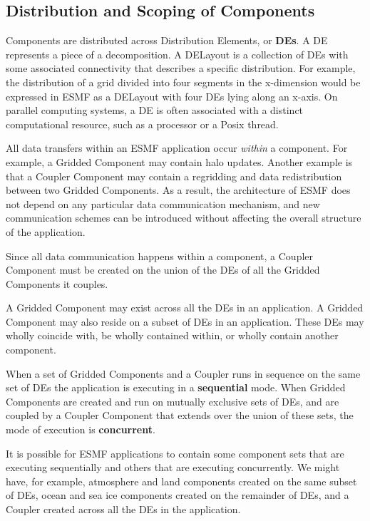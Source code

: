 \subsection{Distribution and Scoping of Components}
\label{sec:scoping}

Components are distributed across Distribution Elements, or {\bf DEs}.
A DE represents a piece of a decomposition.  A DELayout is a collection
of DEs with some associated connectivity that describes a specific 
distribution.  For example, the distribution of a grid divided 
into four segments in the x-dimension would be expressed in ESMF as
a DELayout with four DEs lying along an x-axis. On parallel computing
systems, a DE is often associated with a distinct computational resource, 
such as a processor or a Posix thread.  

All data transfers within an ESMF application occur {\it within} a 
component.  For example, a Gridded Component may contain halo updates.
Another example is that a Coupler Component may contain a regridding 
and data redistribution between two Gridded Components.  As a result, 
the architecture of ESMF does not depend on any particular data 
communication mechanism, and new communication schemes can be 
introduced without affecting the overall structure of the application.

Since all data communication happens within a component, a Coupler 
Component must be created on the union of the DEs of all
the Gridded Components it couples.  

A Gridded Component may exist across all the DEs in an application.  
A Gridded Component may also reside on a subset of DEs in an 
application.  These DEs may wholly coincide with, be wholly contained 
within, or wholly contain another component.  

When a set of Gridded  Components and a Coupler runs in sequence 
on the same set of DEs the application is executing in a {\bf sequential} 
mode. When Gridded Components are created and run on mutually exclusive
sets of DEs, and are coupled by a Coupler Component that extends over
the union of these sets, the mode of execution is {\bf concurrent}.

It is possible for ESMF applications to contain some component sets
that are executing sequentially and others that are executing concurrently.
We might have, for example, atmosphere and land components created 
on the same subset of DEs, ocean and sea ice components created on 
the remainder of DEs, and a Coupler created across all the DEs in
the application.

